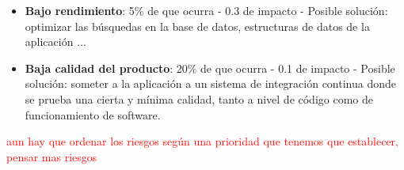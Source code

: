 \begin{itemize}
\item \textbf{Bajo rendimiento}: 5\% de que ocurra - 0.3 de impacto - Posible solución: optimizar las búsquedas en la base de datos, estructuras de datos de la aplicación ...
\item \textbf{Baja calidad del producto}: 20\% de que ocurra - 0.1 de impacto - Posible solución: someter a la aplicación a un sistema de integración continua donde se prueba una cierta y mínima calidad, tanto a nivel de código como de funcionamiento de software. 
\end{itemize}

\textcolor{red}{aun hay que ordenar los riesgos según una prioridad que tenemos que establecer, pensar mas riesgos}